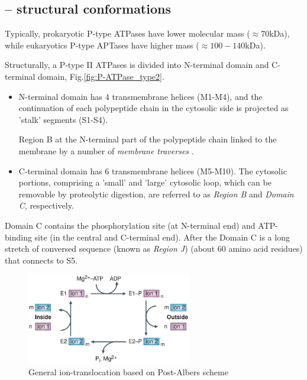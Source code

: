 \subsection{-- structural conformations}
\label{sec:P-ATPase-conformation}

Typically, prokaryotic P-type ATPases have lower molecular mass ($\approx
70$kDa), while eukaryotics P-type APTases have higher mass ($\approx
100-140$kDa).

Structurally, a P-type II ATPases is divided into N-terminal domain and
C-terminal domain, Fig.\ref{fig:P-ATPase_type2}. 
\begin{itemize}

  \item  N-terminal domain has 4 transmembrane helices (M1-M4), and the
  continuation of each polypeptide chain in the cytosolic side is projected as
  'stalk' segments (S1-S4).

Region B at the N-terminal part of the polypeptide chain linked to the membrane
by a number of {\it membrane traverses} \citep{moller1996}. 

  \item  C-terminal domain has 6 transmembrane helices (M5-M10). The cytosolic
  portions, comprising a 'small' and 'large' cytosolic loop, which can be
  removable by proteolytic digestion, are referred to as {\it Region B} and {\it
  Domain C}, respectively.

\end{itemize}
Domain C contains the phosphorylation site (at N-terminal end) and ATP-binding
site (in the central and C-terminal end). After the Domain C is a long stretch
of conversed sequence (known as {\it Region J}) (about 60 amino acid residues)
that connects to S5.


\begin{figure}[hbt]
    \centerline{\includegraphics[height=4cm,
      angle=0]{./images/Post-Albers_cycle.eps}}
    \caption{General ion-translocation based on Post-Albers scheme
    \citep{kuhlbrandt2004}}
    \label{fig:Post-Albers-cycle}
  \end{figure}

